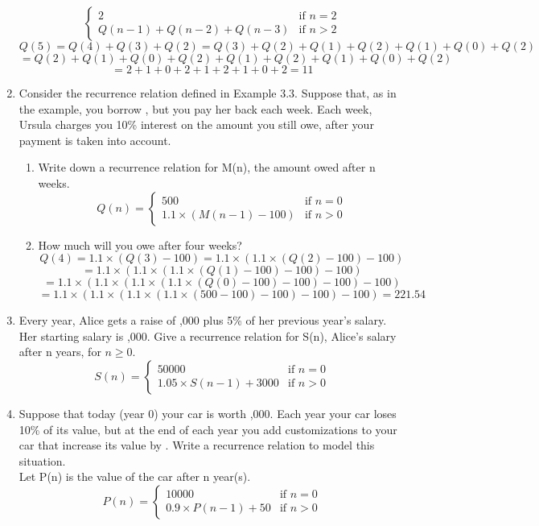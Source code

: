 \documentclass[12pt]{article}
\begin{document}
\begin{enumerate}
\[\begin{cases}
    2 & \text{if } n = 2\\
    Q(n-1) + Q(n-2) + Q(n-3) & \text{if } n > 2
    \end{cases}
    \]
    \[Q(5) = Q(4) + Q(3) + Q(2) = Q(3) + Q(2) + Q(1) + Q(2) + Q(1) + Q(0) + Q(2)\]
    \[=  Q(2) + Q(1) + Q(0) + Q(2) + Q(1) + Q(2) + Q(1) + Q(0) + Q(2)\]
    \[= 2 + 1 + 0 + 2 + 1 + 2 + 1 + 0 + 2 = 11\]
    \item Consider the recurrence relation defined in Example 3.3. Suppose that, as in the example, you borrow , but you pay her back  each week. Each week, Ursula charges you 10\% interest on the amount you still owe, after your  payment is taken into account.
    \begin{enumerate}
        \item Write down a recurrence relation for M(n), the amount owed after n weeks.
        \[
        Q(n) = 
        \begin{cases} 
        500 &     \text{if } n = 0 \\
        1.1 \times (M(n-1)-100) & \text{if } n > 0
        \end{cases}
        \]
        \item How much will you owe after four weeks?
        \[Q(4) = 1.1 \times (Q(3)-100) = 1.1 \times (1.1 \times (Q(2) - 100) - 100)\]
        \[ = 1.1 \times (1.1 \times (1.1\times (Q(1) - 100) - 100) - 100)\]
        \[ = 1.1 \times (1.1 \times (1.1\times (1.1\times (Q(0) - 100) - 100) - 100) - 100)\]
        \[ = 1.1 \times (1.1 \times (1.1\times (1.1\times (500 - 100) - 100) - 100) - 100) = 221.54\]
    \end{enumerate}
    \item Every year, Alice gets a raise of ,000 plus 5\% of her previous year’s salary. Her starting salary is ,000. Give a recurrence relation for S(n), Alice’s salary after n years, for $n \geq 0$.
    \[
    S(n) = 
    \begin{cases} 
    50000 &     \text{if } n = 0 \\
    1.05 \times S(n-1) + 3000 & \text{if } n > 0
    \end{cases}
    \]
    \item Suppose that today (year 0) your car is worth ,000. Each year your car loses 10\% of its value, but at the end of each year you add customizations to your car that increase its value by . Write a recurrence relation to model this situation.\\
    Let P(n) is the value of the car after n year(s).
    \[
    P(n) = 
    \begin{cases} 
    10000 &     \text{if } n = 0 \\
    0.9 \times P(n-1) + 50 & \text{if } n > 0
    \end{cases}
    \]
\end{enumerate}
\end{document}
